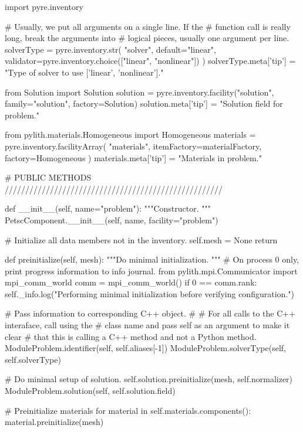\begin{python}
        import pyre.inventory

        # Usually, we put all arguments on a single line. If the
        # function call is really long, break the arguments into
        # logical pieces, usually one argument per line.
        solverType = pyre.inventory.str(
            "solver",
            default="linear",
            validator=pyre.inventory.choice(["linear", "nonlinear"])
        )
        solverType.meta['tip'] = "Type of solver to use ['linear', 'nonlinear']."

        from Solution import Solution
        solution = pyre.inventory.facility("solution", family="solution", factory=Solution)
        solution.meta['tip'] = "Solution field for problem."

        from pylith.materials.Homogeneous import Homogeneous
        materials = pyre.inventory.facilityArray(
            "materials",
            itemFactory=materialFactory,
            factory=Homogeneous
        )
        materials.meta['tip'] = "Materials in problem."

        
    # PUBLIC METHODS /////////////////////////////////////////////////////

    def __init__(self, name="problem"):
        """Constructor.
        """
        PetscComponent.__init__(self, name, facility="problem")

        # Initialize all data members not in the inventory.
        self.mesh = None
        return

    def preinitialize(self, mesh):
        """Do minimal initialization.
        """
        # On process 0 only, print progress information to info journal.
        from pylith.mpi.Communicator import mpi_comm_world
        comm = mpi_comm_world()
        if 0 == comm.rank:
            self._info.log("Performing minimal initialization before verifying configuration.")

        # Pass information to corresponding C++ object.
        #
        # For all calls to the C++ interaface, call using the
        # class name and pass self as an argument to make it clear
        # that this is calling a C++ method and not a Python method.
        ModuleProblem.identifier(self, self.aliases[-1])
        ModuleProblem.solverType(self, self.solverType)

        # Do minimal setup of solution.
        self.solution.preinitialize(mesh, self.normalizer)
        ModuleProblem.solution(self, self.solution.field)

        # Preinitialize materials
        for material in self.materials.components():
            material.preinitialize(mesh)


\end{python}

